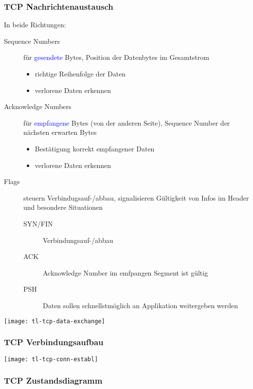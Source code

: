 \subsubsection{TCP Nachrichtenaustausch}
In beide Richtungen:
\begin{description}
	\item[Sequence Numbers] für \textcolor{blue}{gesendete} Bytes,
		Position der Datenbytes im Gesamtstrom
		\begin{itemize}
			\item richtige Reihenfolge der Daten
			\item verlorene Daten erkennen
		\end{itemize}
	\item[Acknowledge Numbers] für \textcolor{blue}{empfangene} Bytes
		(von der anderen Seite), Sequence Number der nächsten erwarten Bytes
		\begin{itemize}
			\item Bestätigung korrekt empfangener Daten
			\item verlorene Daten erkennen
		\end{itemize}
	\item[Flags] steuern Verbindugsauf-/abbau, signalisieren Gültigkeit von Infos
		im Header und besondere Situationen
		\begin{description}
			\item[SYN/FIN] Verbindungsauf-/abbau
			\item[ACK] Acknowledge Number im emfpangen Segment ist gültig
			\item[PSH] Daten sollen schnellstmöglich an Applikation weitergeben werden
		\end{description}
\end{description}

\begin{center}
	\texttt{[image: tl-tcp-data-exchange]}
\end{center}

\subsubsection{TCP Verbindungsaufbau}

\begin{center}
	\texttt{[image: tl-tcp-conn-establ]}
\end{center}


\subsubsection{TCP Zustandsdiagramm}

